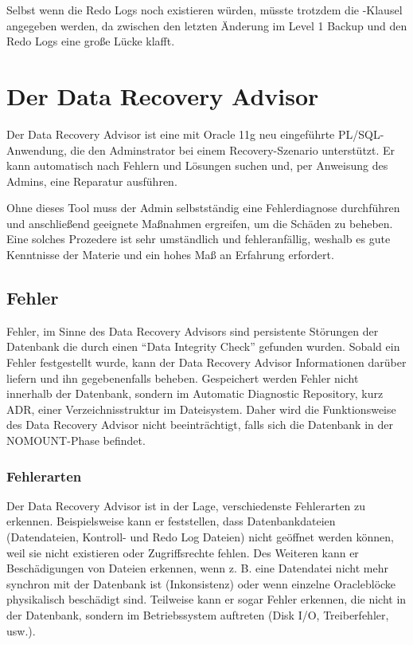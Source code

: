         Selbst wenn die Redo Logs noch existieren w\"urden, m\"usste trotzdem die -Klausel angegeben werden, da zwischen den letzten \"Anderung im Level 1 Backup und den Redo Logs eine gro\ss{}e L\"ucke klafft.
    \section{Der Data Recovery Advisor}
      Der Data Recovery Advisor ist eine mit Oracle 11g neu eingef\"uhrte PL/SQL-Anwendung, die den Adminstrator bei einem Recovery-Szenario unterst\"utzt. Er kann automatisch nach Fehlern und L\"osungen suchen und, per Anweisung des Admins, eine Reparatur ausf\"uhren.

      Ohne dieses Tool muss der Admin selbstst\"andig eine Fehlerdiagnose durchf\"uhren und anschlie\ss{}end geeignete Ma\ss{}nahmen ergreifen, um die Sch\"aden zu beheben. Eine solches Prozedere ist sehr umst\"andlich und fehleranf\"allig, weshalb es gute Kenntnisse der Materie und ein hohes Ma\ss{} an Erfahrung erfordert.
      \subsection{Fehler}
        Fehler, im Sinne des Data Recovery Advisors sind persistente St\"orungen der Datenbank die durch einen \enquote{Data Integrity Check} gefunden wurden. Sobald ein Fehler festgestellt wurde, kann der Data Recovery Advisor Informationen dar\"uber liefern und ihn gegeben\-en\-falls beheben. Gespeichert werden Fehler nicht innerhalb der Datenbank, sondern im Automatic Diagnostic Repository, kurz ADR, einer Verzeichnisstruktur im Dateisystem. Daher wird die Funktionsweise des Data Recovery Advisor nicht beeintr\"achtigt, falls sich die Datenbank in der NOMOUNT-Phase befindet.
        \subsubsection{Fehlerarten}
          Der Data Recovery Advisor ist in der Lage, verschiedenste Fehlerarten zu erkennen. Beispielsweise kann er feststellen, dass Datenbankdateien (Datendateien, Kontroll- und Redo Log Dateien) nicht ge\"offnet werden k\"onnen, weil sie nicht existieren oder Zugriffsrechte fehlen. Des Weiteren kann er Besch\"adigungen von Dateien erkennen, wenn z. B. eine Datendatei nicht mehr synchron mit der Datenbank ist (Inkonsistenz) oder wenn einzelne Oraclebl\"ocke physikalisch besch\"adigt sind. Teilweise kann er sogar Fehler erkennen, die nicht in der Datenbank, sondern im Betriebssystem auftreten (Disk I/O, Treiberfehler, usw.).
